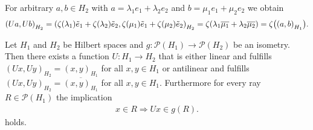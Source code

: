 \begin{example}
	For arbitrary $a,b \in H_2$ with $a = \lambda_1 e_1 + \lambda_2 e_2$ and $b = \mu_1 e_1 + \mu_2 e_2$ we obtain
	\begin{align*}
		{\left ( Ua, Ub \right )}_{H_2} = {\left ( \zeta(\lambda_1) \tilde{e}_1 + \zeta(\lambda_2) \tilde{e}_2, \zeta(\mu_1) \tilde{e}_1 + \zeta(\mu_2) \tilde{e}_2 \right )}_{H_2} = \zeta(\lambda_1 \overline{\mu_1} + \lambda_2 \overline{\mu_2}) = \zeta{\left ( {\left ( a, b \right )}_{H_1} \right )}.
	\end{align*}
\end{example}


\begin{theorem}
	Let $H_1$ and $H_2$ be Hilbert spaces and $g: \mathcal{P}(H_1) \to \mathcal{P}(H_2)$ be an isometry. Then there exists a function $U: H_1 \to H_2$ that is either linear and fulfills $(Ux, Uy)_{H_2} = (x,y)_{H_1}$ for all $x,y \in H_1$ or antilinear and fulfills $(Ux, Uy)_{H_2} = \overline{(x,y)_{H_1}}$ for all $x,y \in H_1$. Furthermore for every ray $R \in \mathcal{P}(H_1)$ the implication
	\begin{align*}
		x \in R \Rightarrow Ux \in g(R).
	\end{align*}
	holds.
\end{theorem}

